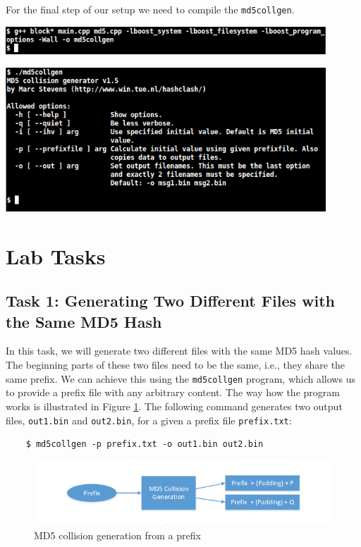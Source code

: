 \documentclass[a4paper]{article}
\begin{document}
\bigskip

For the final step of our setup we need to compile the \texttt{md5collgen}.

\bigskip

\includegraphics[width=0.9\textwidth]{bash/g++.png}

\includegraphics[width=0.9\textwidth]{bash/md5collgen.png}

\section{Lab Tasks}

\subsection{Task 1: Generating Two Different Files with the Same MD5 Hash}

In this task, we will generate two different files with the same MD5 hash values. The beginning parts of these two files need to be the same, i.e., they share the same prefix. We can achieve this using the \texttt{md5collgen} program, which allows us to provide a prefix file with any arbitrary content. The way how the program works is illustrated in Figure \ref{fig:md5gen}. The following command generates two output files, \texttt{out1.bin} and \texttt{out2.bin}, for a given a prefix file \texttt{prefix.txt}:

\begin{verbatim}
    $ md5collgen -p prefix.txt -o out1.bin out2.bin
\end{verbatim}

\begin{figure}[h]
    \centering
    \includegraphics[width=\textwidth]{md5gen.png}
    \caption{MD5 collision generation from a prefix}
    \label{fig:md5gen}
\end{figure}
\end{document}
